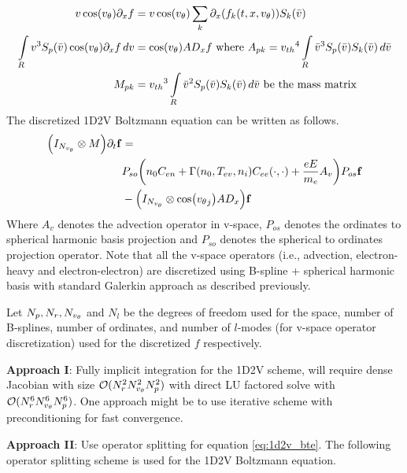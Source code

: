 \documentclass{article}[draft]
\begin{document}
\begin{align*}
	v\cos\of{\vtheta} \partial_x f &= v\cos\of{\vtheta} \sum_{k} \partial_x\of{f_{k}(t,x,\vtheta)} S_k\of{\bar{v}}\\
	\myint_{R} v^3 S_p(\bar{v}) \cos\of{\vtheta} \partial_x f \diff{v} &=\cos\of{\vtheta} A D_x f \text{ where } A_{pk} = {v_{th}}^4 \myint_{R} \bar{v}^3 S_p(\bar{v}) S_k(\bar{v}) \diff{\bar{v}} \\
	M_{pk} &= {v_{th}}^3\myint_{R} \bar{v}^2 S_p(\bar{v}) S_k(\bar{v}) \diff{\bar{v}} \text{ be the mass matrix}
\end{align*} The discretized 1D2V Boltzmann equation can be written as follows. 
\begin{align}
	\of{I_{N_{\vtheta}} \otimes M  } \partial_{t} \vect{f} &= \nonumber\\&P_{so}\of{n_0 C_{en} + \Gamma(n_0, T_{ev}, n_i) C_{ee} (\cdot, \cdot) + \frac{e E}{m_e} A_v} P_{os} \vect{f} \nonumber \\ &- \of{I_{N_{\vtheta}} \otimes \cos\of{\vtheta_j} A D_x  } \vect{f} \label{eq:1d2v_bte}
\end{align} Where $A_v$ denotes the advection operator in v-space, $P_{os}$ denotes the ordinates to spherical harmonic basis projection and $P_{so}$ denotes the spherical to ordinates projection operator. Note that all the v-space operators (i.e., advection, electron-heavy and electron-electron) are discretized using B-spline + spherical harmonic basis with standard Galerkin approach as described previously.

Let $N_p, N_r, N_{v_{\theta}}$ and $N_{l}$ be the degrees of freedom used for the space, number of B-splines, number of ordinates, and number of $l$-modes (for v-space operator discretization) used for the discretized $f$ respectively. 

\textbf{Approach I}: Fully implicit integration for the 1D2V scheme, will require dense Jacobian with size $\mathcal{O}(N_r^2 N_{v_{\theta}}^2 N_p^2)$ with direct LU factored solve with $\mathcal{O}(N_r^6 N_{v_{\theta}}^6 N_p^6)$. One approach might be to use iterative scheme with preconditioning for fast convergence. 

\textbf{Approach II}: Use operator splitting for equation \eqref{eq:1d2v_bte}. The following operator splitting scheme is used for the 1D2V Boltzmann equation. 
\end{document}
